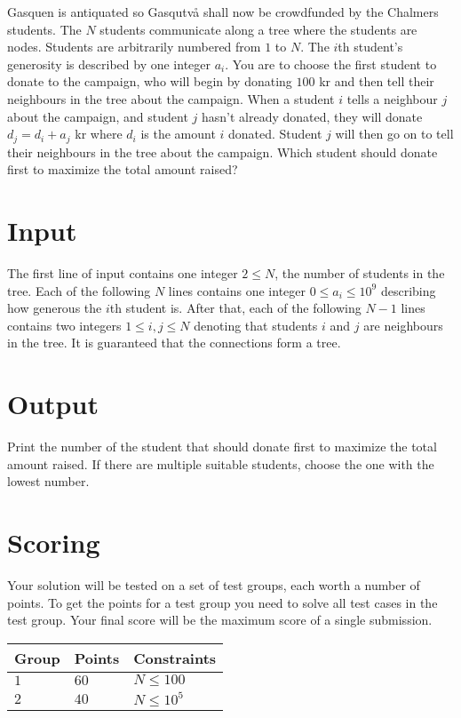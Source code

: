 
Gasquen is antiquated so Gasqutvå shall now be crowdfunded by the Chalmers students.
The $N$ students communicate along a tree where the students are nodes. Students are arbitrarily numbered from $1$ to $N$.
The $i$th student's generosity is described by one integer $a_i$.
You are to choose the first student to donate to the campaign, who will begin by donating $100$ kr and then tell their neighbours in the tree about the campaign.
When a student $i$ tells a neighbour $j$ about the campaign, and student $j$ hasn't already donated, they will donate $d_j=d_i+a_j$ kr where $d_i$ is the amount $i$ donated.
Student $j$ will then go on to tell their neighbours in the tree about the campaign.
Which student should donate first to maximize the total amount raised?

\section*{Input}

The first line of input contains one integer $2 \leq N$, the number of students in the tree.
Each of the following $N$ lines contains one integer $0 \leq a_i \leq 10^9$ describing how generous the $i$th student is.
After that, each of the following $N-1$ lines contains two integers $1\leq i, j \leq N$ denoting that students $i$ and $j$ are neighbours in the tree.
It is guaranteed that the connections form a tree.

\section*{Output}

Print the number of the student that should donate first to maximize the total amount raised. If there are multiple suitable students, choose the one with the lowest number.

\section*{Scoring}

Your solution will be tested on a set of test groups, each worth a number of points. To get the
points for a test group you need to solve all test cases in the test group. Your final score will be
the maximum score of a single submission.

\noindent
\begin{tabular}{| l | l | l |}
\hline
Group & Points     & Constraints \\ \hline
$1$   & $60$       & $N \leq 100$ \\ \hline
$2$   & $40$       & $N \leq 10^5$ \\ \hline
\end{tabular}
